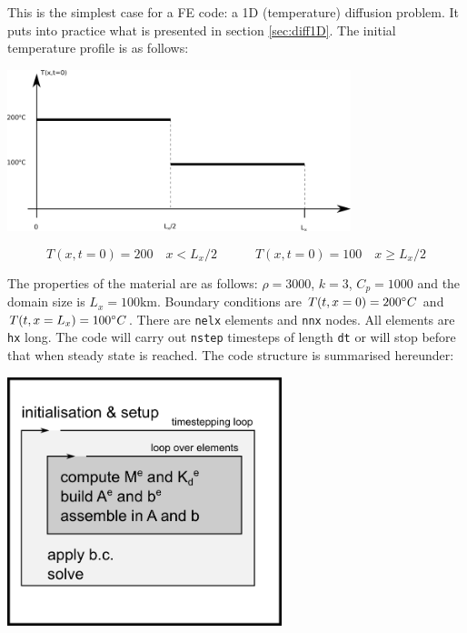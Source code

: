 This is the simplest case for a FE code: a 1D (temperature) diffusion problem. 
It puts into practice what is presented in section \ref{sec:diff1D}.
The initial temperature profile is as follows:

\begin{center}
\includegraphics[width=10cm]{python_codes/fieldstone_42/images/tempinit}
\end{center}

\[
T(x,t=0)=200 \quad x<L_x/2
\quad\quad\quad
T(x,t=0)=100 \quad x\geq L_x/2
\]

The properties of the material are as follows:
$\rho=3000$, $k=3$, $C_p=1000$ and the domain size is $L_x=100\text{km}$.
Boundary conditions are $T(t,x=0)=200\degree C$ and $T(t,x=L_x)=100\degree C$.
There are {\tt nelx} elements and {\tt nnx} nodes. 
All elements are {\tt hx} long. 
The code will carry out {\tt nstep} timesteps of length {\tt dt} or will stop before that
when steady state is reached.
The code structure is summarised hereunder:
\begin{center}
\includegraphics[width=8cm]{python_codes/fieldstone_42/images/flowchart}
\end{center}

